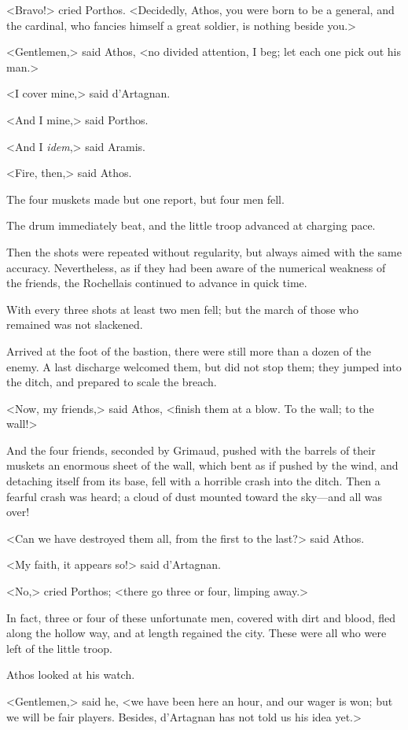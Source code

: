 <Bravo!> cried Porthos. <Decidedly, Athos, you were born to be a general, and the cardinal, who fancies himself a great soldier, is nothing beside you.> 

<Gentlemen,> said Athos, <no divided attention, I beg; let each one pick out his man.> 

<I cover mine,> said d'Artagnan. 

<And I mine,> said Porthos. 

<And I \textit{idem},> said Aramis. 

<Fire, then,> said Athos. 

The four muskets made but one report, but four men fell. 

The drum immediately beat, and the little troop advanced at charging pace. 

Then the shots were repeated without regularity, but always aimed with the same accuracy. Nevertheless, as if they had been aware of the numerical weakness of the friends, the Rochellais continued to advance in quick time. 

With every three shots at least two men fell; but the march of those who remained was not slackened. 

Arrived at the foot of the bastion, there were still more than a dozen of the enemy. A last discharge welcomed them, but did not stop them; they jumped into the ditch, and prepared to scale the breach. 

<Now, my friends,> said Athos, <finish them at a blow. To the wall; to the wall!> 

And the four friends, seconded by Grimaud, pushed with the barrels of their muskets an enormous sheet of the wall, which bent as if pushed by the wind, and detaching itself from its base, fell with a horrible crash into the ditch. Then a fearful crash was heard; a cloud of dust mounted toward the sky---and all was over! 

<Can we have destroyed them all, from the first to the last?> said Athos. 

<My faith, it appears so!> said d'Artagnan. 

<No,> cried Porthos; <there go three or four, limping away.> 

In fact, three or four of these unfortunate men, covered with dirt and blood, fled along the hollow way, and at length regained the city. These were all who were left of the little troop. 

Athos looked at his watch. 

<Gentlemen,> said he, <we have been here an hour, and our wager is won; but we will be fair players. Besides, d'Artagnan has not told us his idea yet.> 

